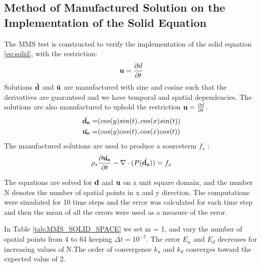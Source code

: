 \subsection{Method of Manufactured Solution on the Implementation of the Solid Equation}
The MMS test is constructed to verify the implementation of the solid equation \eqref{eq:solid}, with the restriction:
\begin{equation}
\bold{u}=\frac{\partial d}{\partial t}
\end{equation}
Solutions $\hat{\bold{d}}$ and $\hat{\bold{u}}$ are manufactured with sine and cosine such that the derivatives are guaranteed and we have temporal and spatial dependencies.
The solutions are also manufactured to uphold the restriction $\bold{u}=\frac{\partial d}{\partial t}$.
\begin{align*}
\hat{\bold{d_e}} =& ( cos(y)sin(t) , cos(x)sin(t) )\\
\hat{\bold{u_e}} =& ( cos(y)cos(t), cos(x)cos(t) )
\end{align*}
The manufactured solutions are used to produce a sourceterm $f_s$ :
\begin{equation}
\rho_s \frac{\partial \hat{\bold{u_e}}}{\partial t} - \nabla \cdot ( P(\hat{\bold{d_e}}) ) = f_s 
\end{equation}

The equations are solved for $\bold{d}$ and $\bold{u}$ on a unit square domain, and the number N denotes the number of spatial points in x and y direction.
The computations were simulated for 10 time steps and the error was calculated for each time step and then the mean of all the errors were used as a measure of the error.

In Table \ref{tab:MMS_SOLID_SPACE} we set m = 1, and vary the number of spatial points from 4 to 64 keeping $\Delta t = 10^{-7}$. The error $E_u$ and $E_d$ decreases for increasing values of N.The order of convergence $k_u$ and $k_d$ converges toward the expected value of 2.

